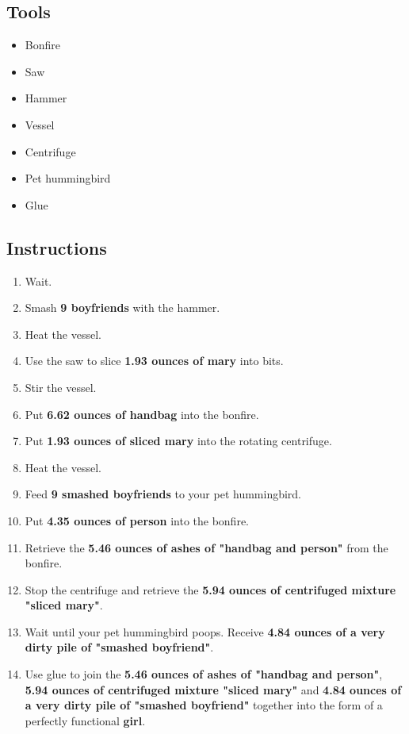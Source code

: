 \documentclass{article}
\begin{document}
\subsection{Tools}\begin{itemize}
\item 
Bonfire
\item 
Saw
\item 
Hammer
\item 
Vessel
\item 
Centrifuge
\item 
Pet hummingbird
\item 
Glue
\end{itemize}
\subsection{Instructions}\begin{enumerate}
\item 
Wait.
\item 
Smash \textbf{9 boyfriends} with the hammer.
\item 
Heat the vessel.
\item 
Use the saw to slice \textbf{1.93 ounces of mary} into bits.
\item 
Stir the vessel.
\item 
Put \textbf{6.62 ounces of handbag} into the bonfire.
\item 
Put \textbf{1.93 ounces of sliced mary} into the rotating centrifuge.
\item 
Heat the vessel.
\item 
Feed \textbf{9 smashed boyfriends} to your pet hummingbird.
\item 
Put \textbf{4.35 ounces of person} into the bonfire.
\item 
Retrieve the \textbf{5.46 ounces of ashes of "handbag and person"} from the bonfire.
\item 
Stop the centrifuge and retrieve the \textbf{5.94 ounces of centrifuged mixture "sliced mary"}.
\item 
Wait until your pet hummingbird poops. Receive \textbf{4.84 ounces of a very dirty pile of "smashed boyfriend"}.
\item 
Use glue to join the \textbf{5.46 ounces of ashes of "handbag and person"}, \textbf{5.94 ounces of centrifuged mixture "sliced mary"} and \textbf{4.84 ounces of a very dirty pile of "smashed boyfriend"} together into the form of a perfectly functional \textbf{girl}.
\end{enumerate}
\newpage
\end{document}
